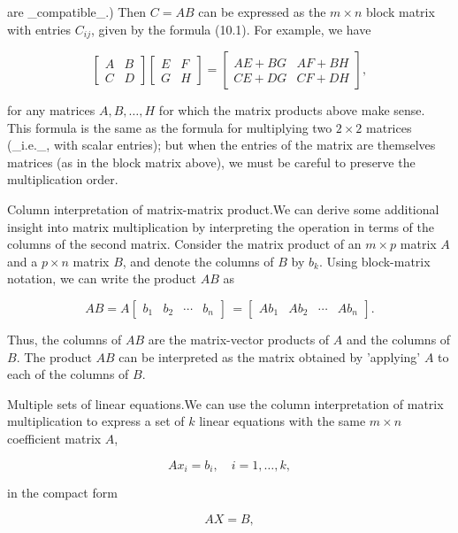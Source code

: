 are _compatible_.) Then \(C=AB\) can be expressed as the \(m\times n\) block matrix with entries \(C_{ij}\), given by the formula (10.1). For example, we have

\[\left[\begin{array}{cc}A&B\\ C&D\end{array}\right]\left[\begin{array}{cc}E&F\\ G&H\end{array}\right]=\left[\begin{array}{cc}AE+BG&AF+BH\\ CE+DG&CF+DH\end{array}\right],\]

for any matrices \(A,B,\ldots,H\) for which the matrix products above make sense. This formula is the same as the formula for multiplying two \(2\times 2\) matrices (_i.e._, with scalar entries); but when the entries of the matrix are themselves matrices (as in the block matrix above), we must be careful to preserve the multiplication order.

Column interpretation of matrix-matrix product.We can derive some additional insight into matrix multiplication by interpreting the operation in terms of the columns of the second matrix. Consider the matrix product of an \(m\times p\) matrix \(A\) and a \(p\times n\) matrix \(B\), and denote the columns of \(B\) by \(b_{k}\). Using block-matrix notation, we can write the product \(AB\) as

\[AB=A\left[\begin{array}{cccc}b_{1}&b_{2}&\cdots&b_{n}\end{array}\right]\,= \left[\begin{array}{cccc}Ab_{1}&Ab_{2}&\cdots&Ab_{n}\end{array}\right].\]

Thus, the columns of \(AB\) are the matrix-vector products of \(A\) and the columns of \(B\). The product \(AB\) can be interpreted as the matrix obtained by 'applying' \(A\) to each of the columns of \(B\).

Multiple sets of linear equations.We can use the column interpretation of matrix multiplication to express a set of \(k\) linear equations with the same \(m\times n\) coefficient matrix \(A\),

\[Ax_{i}=b_{i},\quad i=1,\ldots,k,\]

in the compact form

\[AX=B,\]

